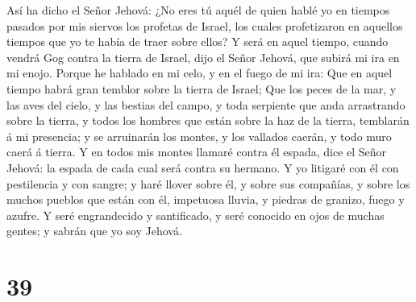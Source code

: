  Así ha dicho el Señor Jehová: ¿No eres tú aquél de quien
hablé yo en tiempos pasados por mis siervos los profetas de Israel, los
cuales profetizaron en aquellos tiempos que yo te había de traer sobre
ellos?  Y será en aquel tiempo, cuando vendrá Gog contra
la tierra de Israel, dijo el Señor Jehová, que subirá mi ira en mi
enojo.  Porque he hablado en mi celo, y en el fuego de mi
ira: Que en aquel tiempo habrá gran temblor sobre la tierra de Israel;
 Que los peces de la mar, y las aves del cielo, y las
bestias del campo, y toda serpiente que anda arrastrando sobre la
tierra, y todos los hombres que están sobre la haz de la tierra,
temblarán á mi presencia; y se arruinarán los montes, y los vallados
caerán, y todo muro caerá á tierra.  Y en todos mis
montes llamaré contra él espada, dice el Señor Jehová: la espada de cada
cual será contra su hermano.  Y yo litigaré con él con
pestilencia y con sangre; y haré llover sobre él, y sobre sus compañías,
y sobre los muchos pueblos que están con él, impetuosa lluvia, y piedras
de granizo, fuego y azufre.  Y seré engrandecido y
santificado, y seré conocido en ojos de muchas gentes; y sabrán que yo
soy Jehová.

\hypertarget{section-38}{%
\section{39}\label{section-38}}

